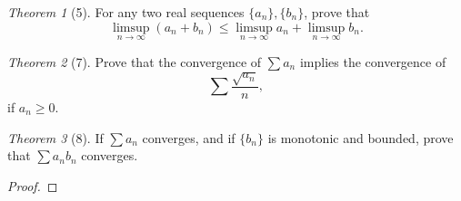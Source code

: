 \documentclass[12pt]{article}
\theoremstyle{remark}
\theoremstyle{named}
\newtheorem*{theorem}{Theorem}
\begin{document}
\begin{theorem}[5]
    For any two real sequences \(\{a_n\}, \{b_n\}\), prove that 
    \[\limsup_{n \to \infty} (a_n + b_n) \le \limsup_{n \to \infty} a_n + \limsup_{n \to \infty} b_n.\]
\end{theorem}

\begin{theorem}[7]
    Prove that the convergence of \(\sum a_n\) implies the convergence of 
    \[\sum \frac{\sqrt{a_n}}{n},\]
    if \(a_n \ge 0\).
\end{theorem}

\begin{theorem}[8]
    If \(\sum a_n\) converges, and if \(\{b_n\}\) is monotonic and bounded, prove that \(\sum a_n b_n\) converges. 
\end{theorem}

\begin{proof}
    
\end{proof}
\end{document}
